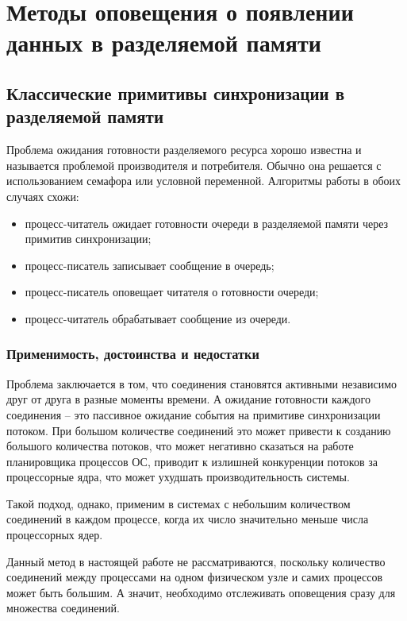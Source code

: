 \section{Методы оповещения о появлении данных в разделяемой памяти}

\subsection{Классические примитивы синхронизации в разделяемой памяти}\label{chapter31:NaivePolling}

Проблема ожидания готовности разделяемого ресурса хорошо известна и называется проблемой производителя и потребителя. Обычно она решается с использованием семафора или условной переменной. Алгоритмы работы в обоих случаях схожи:
\begin{itemize}
\item процесс-читатель ожидает готовности очереди в разделяемой памяти через примитив синхронизации;
\item процесс-писатель записывает сообщение в очередь;
\item процесс-писатель оповещает читателя о готовности очереди;
\item процесс-читатель обрабатывает сообщение из очереди.
\end{itemize}

\subsubsection{Применимость, достоинства и недостатки}

Проблема заключается в том, что соединения становятся активными независимо друг от друга в разные моменты времени. А ожидание готовности каждого соединения -- это пассивное ожидание события на примитиве синхронизации потоком. При большом количестве соединений это может привести к созданию большого количества потоков, что может негативно сказаться на работе планировщика процессов ОС, приводит к излишней конкуренции потоков за процессорные ядра, что может ухудшать производительность системы.

Такой подход, однако, применим в системах с небольшим количеством соединений в каждом процессе, когда их число значительно меньше числа процессорных ядер.

Данный метод в настоящей работе не рассматриваются, поскольку количество соединений между процессами на одном физическом узле и самих процессов может быть большим. А значит, необходимо отслеживать оповещения сразу для множества соединений.

